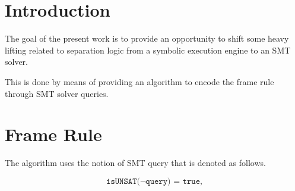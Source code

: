 \documentclass[sigplan,screen,review]{acmart}
\begin{document}



\maketitle


\newcommand{\EM}[1]{\ensuremath{#1}}
\newcommand{\ssymbol}[1]{\EM{#1}}
\newcommand{\bnfdef}{\EM{\vcentcolon\vcentcolon=}}
\newcommand{\emphbf}[1]{\textbf{\emph{#1}}}
\newcommand{\spmid}{\EM{\ \mid \ }}
\newcommand{\vsample}[1]{\EM{\mathit{sample}(#1)}}
\newcommand{\vconst}{\EM{\mathsf{c}}}
\newcommand{\anyval}{\ssymbol{v}}
\newcommand{\anydist}{\ssymbol{d}}
\newcommand{\dnormal}[2]{\EM{\mathit{Normal}(#1,#2)}}
\newcommand{\duniform}[2]{\EM{\mathit{Uniform}(#1,#2)}}

\section{Introduction} 





The goal of the present work is to provide an opportunity to shift some heavy lifting related to separation logic from a symbolic execution engine to an SMT solver. 

This is done by means of providing an algorithm to encode the frame rule through SMT solver queries. 


\section{Frame Rule}

The algorithm uses the notion of SMT query that is denoted as follows.

\[
\texttt{isUNSAT($\neg$query) = true,}
\]
\end{document}
